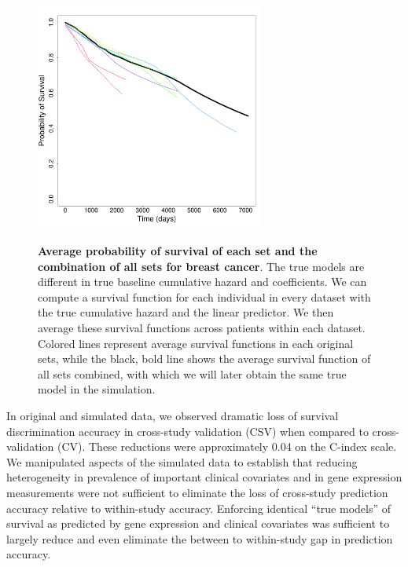 \documentclass{bioinfo}
\begin{document}
\begin{figure}
  \centering
  \includegraphics[width=7.5cm]{survival_plot.pdf}\\
  \caption{\textbf{Average probability of survival of each set and the
      combination of all sets for breast cancer}. The true models are different in true
    baseline cumulative hazard and coefficients. We can compute %
    a survival function for each individual in every dataset with the
    true cumulative hazard and the linear predictor. 
    We then average these survival functions across patients within each dataset.
    Colored lines represent average survival functions in each original
    sets, while the black, bold line shows the average survival function of
    all sets combined, with which we will later obtain the same true
    model in the simulation.}\label{survplot}
\end{figure}


In original and simulated data,  we observed
dramatic loss of survival discrimination accuracy in cross-study
validation (CSV) when compared to cross-validation (CV). These reductions were
approximately 0.04 on the C-index scale. We manipulated aspects of
the simulated data to establish that reducing heterogeneity in
prevalence of important clinical covariates and in gene expression
measurements were not sufficient to eliminate the loss of cross-study
prediction accuracy relative to within-study accuracy.  %
Enforcing identical ``true models'' of survival as predicted by gene expression and clinical covariates
was sufficient to largely reduce and even eliminate the between to within-study gap in
prediction accuracy. %
\end{document}
